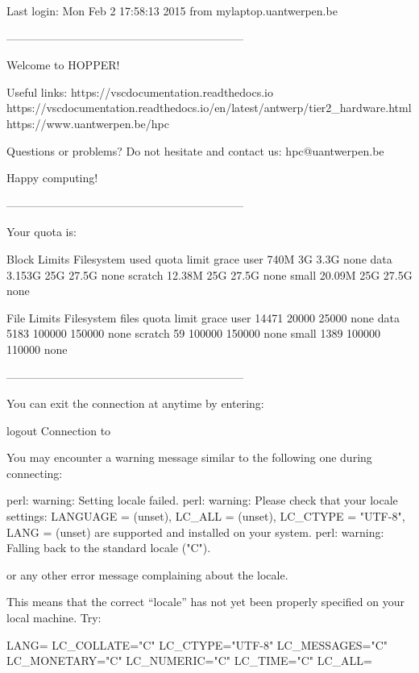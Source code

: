 \begin{prompt}
Last login: Mon Feb  2 17:58:13 2015 from mylaptop.uantwerpen.be

---------------------------------------------------------------

Welcome to HOPPER!

Useful links:
  https://vscdocumentation.readthedocs.io
  https://vscdocumentation.readthedocs.io/en/latest/antwerp/tier2_hardware.html
  https://www.uantwerpen.be/hpc

Questions or problems? Do not hesitate and contact us:
  hpc@uantwerpen.be

Happy computing!

---------------------------------------------------------------

Your quota is:

                   Block Limits
   Filesystem       used      quota      limit    grace
   user             740M         3G       3.3G     none
   data           3.153G        25G      27.5G     none
   scratch        12.38M        25G      27.5G     none
   small          20.09M        25G      27.5G     none

                   File Limits
   Filesystem      files      quota      limit    grace
   user            14471      20000      25000     none
   data             5183     100000     150000     none
   scratch            59     100000     150000     none
   small            1389     100000     110000     none

---------------------------------------------------------------

\end{prompt}
\fi  %

You can exit the connection at anytime by entering:

\begin{prompt}
logout
Connection to %
\end{prompt}

\begin{tip}

You may encounter a warning message similar to the following one during connecting:

\begin{prompt}
perl: warning: Setting locale failed.
perl: warning: Please check that your locale settings:
LANGUAGE = (unset),
LC_ALL = (unset),
LC_CTYPE = "UTF-8",
LANG = (unset)
    are supported and installed on your system.
perl: warning: Falling back to the standard locale ("C").
\end{prompt}

or any other error message complaining about the locale.

This means that the correct ``locale'' has not yet been properly specified on
your local machine. Try:

\begin{prompt}
LANG=
LC_COLLATE="C"
LC_CTYPE="UTF-8"
LC_MESSAGES="C"
LC_MONETARY="C"
LC_NUMERIC="C"
LC_TIME="C"
LC_ALL=
\end{prompt}
\end{tip}

